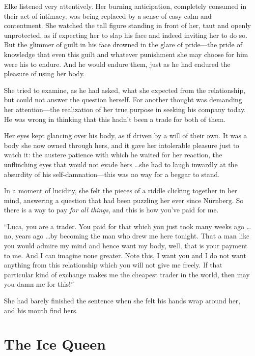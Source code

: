 Elke listened very attentively. Her burning anticipation, completely consumed in their act of intimacy, was being replaced by a sense of easy calm and contentment. She watched the tall figure standing in front of her, taut and openly unprotected, as if expecting her to slap his face and indeed inviting her to do so. But the glimmer of guilt in his face drowned in the glare of pride---the pride of knowledge that even this guilt and whatever punishment she may choose for him were his to endure. And he would endure them, just as he had endured the pleasure of using her body.

She tried to examine, as he had asked, what she expected from the relationship, but could not answer the question herself. For another thought was demanding her attention---the realization of her true purpose in seeking his company today. He was wrong in thinking that this hadn't been a trade for both of them.

Her eyes kept glancing over his body, as if driven by a will of their own. It was a body she now owned through hers, and it gave her intolerable pleasure just to watch it: the austere patience with which he waited for her reaction, the unflinching eyes that would not evade hers \ldots she had to laugh inwardly at the absurdity of his self-damnation---this was no way for a beggar to stand.

In a moment of lucidity, she felt the pieces of a riddle clicking together in her mind, answering a question that had been puzzling her ever since Nürnberg. So there is a way to pay \emph{for all things}, and this is how you've paid for me.

``Luca, you are a trader. You paid for that which you just took many weeks ago \ldots no, years ago \ldots by becoming the man who drew me here tonight. That a man like you would admire my mind and hence want my body, well, that is your payment to me. And I can imagine none greater. Note this, I want you and I do not want anything from this relationship which you will not give me freely. If that particular kind of exchange makes me the cheapest trader in the world, then may you damn me for this!''

She had barely finished the sentence when she felt his hands wrap around her, and his mouth find hers.

\chapter{The Ice Queen}

